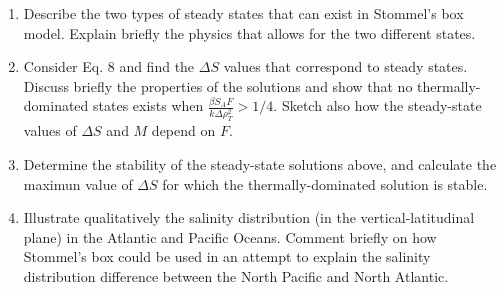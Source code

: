 \documentclass[a4paper,11pt]{article}
\begin{document}
\begin{enumerate}
\item Describe the two types of steady states that can exist in Stommel's box model. Explain briefly the physics that allows for the two different states.

\item Consider Eq. 8 and find the $\Delta S$ values that correspond to steady states. Discuss briefly the properties of the solutions and show that no thermally-dominated states exists when $\frac{\beta S_{A}F}{k\Delta \rho_{T}^{2}} > 1/4$. Sketch also how the steady-state values of $\Delta S$ and $M$ depend on $F$.

\item Determine the stability of the steady-state solutions above, and calculate the maximun value of $\Delta S$ for which the thermally-dominated solution is stable.

\item Illustrate qualitatively the salinity distribution (in the vertical-latitudinal plane) in the Atlantic and Pacific Oceans. Comment briefly on how Stommel's box could be used in an attempt to explain the salinity distribution difference between the North Pacific and North Atlantic.
\end{enumerate}
\end{document}
